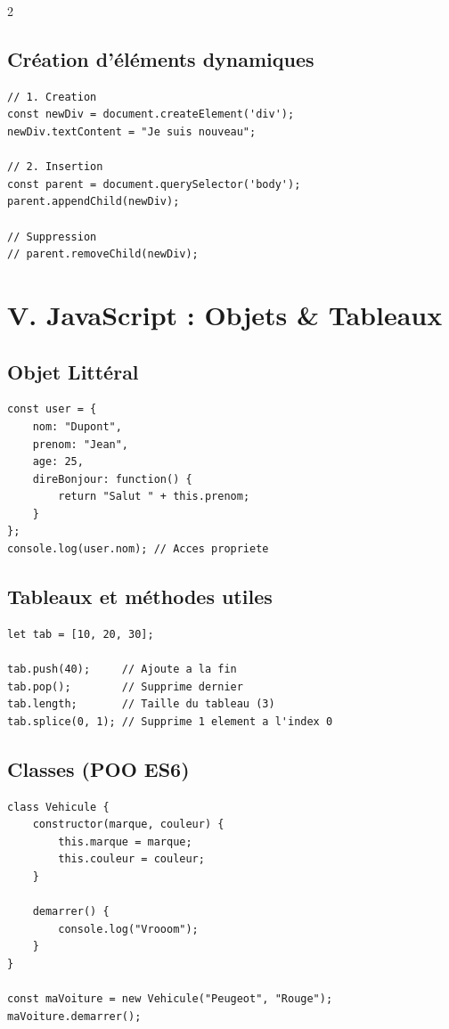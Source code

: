 \documentclass[11pt,a4paper]{article}
\begin{document}
\begin{multicols*}{2}
\subsection{Création d'éléments dynamiques}
\begin{lstlisting}
// 1. Creation
const newDiv = document.createElement('div');
newDiv.textContent = "Je suis nouveau";

// 2. Insertion
const parent = document.querySelector('body');
parent.appendChild(newDiv); 

// Suppression
// parent.removeChild(newDiv);
\end{lstlisting}

\section{V. JavaScript : Objets \& Tableaux}

\subsection{Objet Littéral}
\begin{lstlisting}
const user = {
    nom: "Dupont",
    prenom: "Jean",
    age: 25,
    direBonjour: function() {
        return "Salut " + this.prenom;
    }
};
console.log(user.nom); // Acces propriete
\end{lstlisting}

\subsection{Tableaux et méthodes utiles}
\begin{lstlisting}
let tab = [10, 20, 30];

tab.push(40);     // Ajoute a la fin
tab.pop();        // Supprime dernier
tab.length;       // Taille du tableau (3)
tab.splice(0, 1); // Supprime 1 element a l'index 0
\end{lstlisting}

\subsection{Classes (POO ES6)}
\begin{lstlisting}
class Vehicule {
    constructor(marque, couleur) {
        this.marque = marque;
        this.couleur = couleur;
    }
    
    demarrer() {
        console.log("Vrooom");
    }
}

const maVoiture = new Vehicule("Peugeot", "Rouge");
maVoiture.demarrer();
\end{lstlisting}

\end{multicols*}
\end{document}

